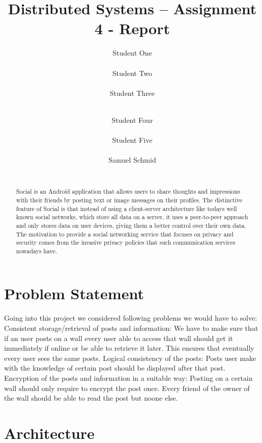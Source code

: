 \documentclass{report}
\title{Distributed Systems -- Assignment 4 - Report}
\author{
%
%
\alignauthor Student One\\
	\affaddr{ETH ID XX-XXX-XXX}\\
	\email{one@student.ethz.ch}
\alignauthor Student Two\\
	\affaddr{ETH ID XX-XXX-XXX}\\
	\email{two@student.ethz.ch}
\alignauthor Student Three\\
	\affaddr{ETH ID XX-XXX-XXX}\\
	\email{three@student.ethz.ch}
\and  %
\alignauthor Student Four\\
 	\affaddr{ETH ID XX-XXX-XXX}\\
 	\email{four@student.ethz.ch}
\alignauthor Student Five\\
 	\affaddr{ETH ID XX-XXX-XXX}\\
 	\email{five@student.ethz.ch}
\alignauthor Samuel Schmid\\
 	\affaddr{ETH ID 10-919-991}\\
 	\email{schmisam@student.ethz.ch}
}
\begin{document}
\maketitle

\begin{abstract}
Social is an Android application that allows users to share thoughts and impressions with their friends by posting text or image messages on their profiles.
The distinctive feature of Social is that instead of using a client-server architecture like todays well known social networks, which store all data on a server, it uses a peer-to-peer approach and only stores data on user devices, giving them a better control over their own data.
The motivation to provide a social networking service that focuses on privacy and security comes from the invasive privacy policies that such communication services nowadays have.
\end{abstract}

\section{Problem Statement}

Going into this project we considered following problems we would have to solve: \newline
Consistent storage/retrieval of posts and information:  \newline
We have to make sure that if an user posts on a wall every user able to access that wall should get it immediately if online or be able to retrieve it later. This ensures that eventually every user sees the same posts.  \newline
Logical consistency of the posts:  \newline
Posts user make with the knowledge of certain post should be displayed after that post.  \newline
Encryption of the posts and information in a suitable way:  \newline
Posting on a certain wall should only require to encrypt the post once. Every friend of the owner of the wall should be able to read the post but noone else. \newline


\section{Architecture}
\end{document}
